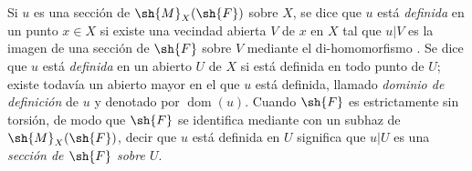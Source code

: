\begin{env}[20.1.7]
\label{IV.20.1.7}
Si $u$ es una sección de $\sh{M}_X(\sh{F})$ sobre $X$, se dice que $u$ está \emph{definida} en un punto $x\in X$ si existe una vecindad abierta $V$ de $x$ en $X$ tal que $u|V$ es la imagen de una sección de $\sh{F}$ sobre $V$ mediante el di-homomorfismo .
Se dice que $u$ está \emph{definida} en un abierto $U$ de $X$ si está definida en todo punto de $U$; existe todavía un abierto mayor en el que $u$ está definida, llamado \emph{dominio de definición} de $u$ y denotado por $\operatorname{dom}(u)$.
Cuando $\sh{F}$ es estrictamente sin torsión, de modo que $\sh{F}$ se identifica mediante  con un subhaz de $\sh{M}_X(\sh{F})$, decir que $u$ está definida en $U$ significa que $u|U$ es una \emph{sección de $\sh{F}$ sobre $U$}.
\end{env}

